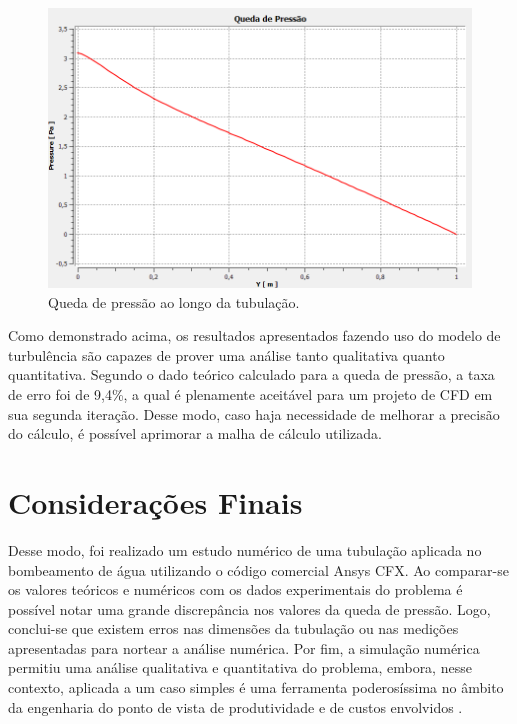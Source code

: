\documentclass[12pt]{article}
\begin{document}
\begin{figure}[H]
    \centering
    \includegraphics[width=.5\textwidth]{fig/pressure_loss_turbulent.png}
    \caption{Queda de pressão ao longo da tubulação.}
		\label{fig:isometric}
\end{figure}

Como demonstrado acima, os resultados apresentados fazendo uso do modelo de turbulência são capazes de prover uma análise tanto qualitativa quanto quantitativa. Segundo o dado teórico calculado para a queda de pressão, a taxa de erro foi de 9,4\%, a qual é plenamente aceitável para um projeto de CFD em sua segunda iteração. Desse modo, caso haja necessidade de melhorar a precisão do cálculo, é possível aprimorar a malha de cálculo utilizada.

\section{Considerações Finais}
Desse modo, foi realizado um estudo numérico de uma tubulação aplicada no bombeamento de água utilizando o código comercial Ansys CFX. Ao comparar-se os valores teóricos e numéricos com os dados experimentais do problema é possível notar uma grande discrepância nos valores da queda de pressão. Logo, conclui-se que existem erros nas dimensões da tubulação ou nas medições apresentadas para nortear a análise numérica. Por fim, a simulação numérica permitiu uma análise qualitativa e quantitativa do problema, embora, nesse contexto, aplicada a um caso simples é uma ferramenta poderosíssima no âmbito da engenharia do ponto de vista de produtividade e de custos envolvidos \cite{cfd}.



\end{document}
